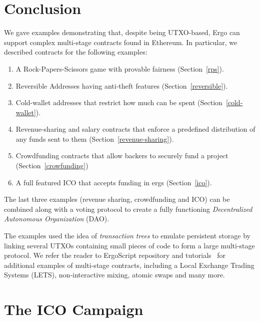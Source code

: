 \documentclass[runningheads]{llncs}
\newcommand{\langname}{ErgoScript\xspace}
\begin{document}
\section{Conclusion}

We gave examples demonstrating that, despite being UTXO-based, Ergo can support complex multi-stage contracts found in Ethereum. In particular, we described  contracts for the following examples: 

\begin{enumerate}
	\item A Rock-Papers-Scissors game with provable fairness (Section~\ref{rps}).
	\item Reversible Addresses having anti-theft features (Section~\ref{reversible}).
	\item Cold-wallet addresses that restrict how much can be spent (Section~\ref{cold-wallet}).
	\item Revenue-sharing and salary contracts that enforce a predefined distribution of any funds sent to them (Section~\ref{revenue-sharing}).
	\item Crowdfunding contracts that allow backers to securely fund a project (Section~\ref{crowfunding})
	\item A full featured ICO that accepts funding in ergs (Section~\ref{ico}). 

\end{enumerate}

The last three examples (revenue sharing, crowdfunding and ICO) can be combined along with a voting protocol to create a fully functioning {\em Decentralized Autonomous Organization} (DAO).


The examples used the idea of {\em transaction trees} to emulate persistent storage by linking several UTXOs containing small pieces of code to form a large multi-stage protocol. 
We refer the reader to \langname repository and tutorials~\cite{langrepo,tutorial,advtutorial} for additional examples of multi-stage contracts, including a Local Exchange Trading Systems (LETS), non-interactive mixing, atomic swaps and many more.




\appendix

\section{The ICO Campaign}
\end{document}
